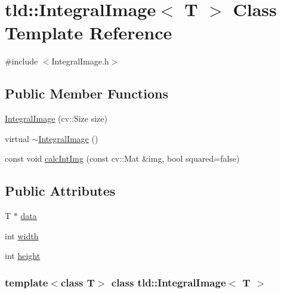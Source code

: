 \hypertarget{classtld_1_1_integral_image}{
\section{tld::IntegralImage$<$ T $>$ Class Template Reference}
\label{classtld_1_1_integral_image}
}


{\ttfamily \#include $<$IntegralImage.h$>$}

\subsection*{Public Member Functions}
\begin{DoxyCompactItemize}
\item 
\hyperlink{classtld_1_1_integral_image_abc8beb4ec0dcfb6f28645648f5849250}{IntegralImage} (cv::Size size)
\item 
virtual \hyperlink{classtld_1_1_integral_image_a79213d3f8187e10f1dc49f0b7e499caa}{$\sim$IntegralImage} ()
\item 
const void \hyperlink{classtld_1_1_integral_image_a13d92babc3fa76029ffcec494b916070}{calcIntImg} (const cv::Mat \&img, bool squared=false)
\end{DoxyCompactItemize}
\subsection*{Public Attributes}
\begin{DoxyCompactItemize}
\item 
T $\ast$ \hyperlink{classtld_1_1_integral_image_a671be18d2f3a30aa1aea12d63a787e48}{data}
\item 
int \hyperlink{classtld_1_1_integral_image_af8ea5fee24e9726087c0e9f6159141e8}{width}
\item 
int \hyperlink{classtld_1_1_integral_image_ad5f65eee66dc3ba0d8f0462f858c1e99}{height}
\end{DoxyCompactItemize}
\subsubsection*{template$<$class T$>$ class tld::IntegralImage$<$ T $>$}



